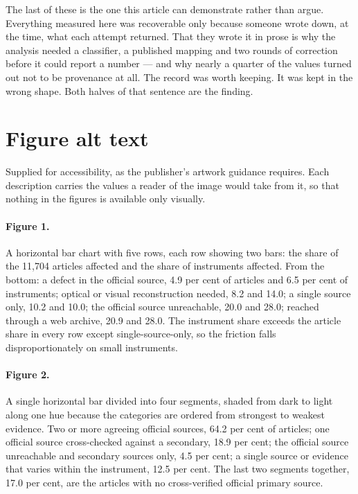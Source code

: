 \documentclass[11pt]{article}
\begin{document}
The last of these is the one this article can demonstrate rather than argue.
Everything measured here was recoverable only because someone wrote down, at
the time, what each attempt returned. That they wrote it in prose is why the
analysis needed a classifier, a published mapping and two rounds of correction
before it could report a number --- and why nearly a quarter of the values
turned out not to be provenance at all. The record was worth keeping. It was
kept in the wrong shape. Both halves of that sentence are the finding.

\section*{Figure alt text}

Supplied for accessibility, as the publisher's artwork guidance requires. Each
description carries the values a reader of the image would take from it, so
that nothing in the figures is available only visually.

\paragraph{Figure 1.} A horizontal bar chart with five rows, each row showing
two bars: the share of the 11,704 articles affected and the share of
instruments affected. From the bottom: a defect in the official source, 4.9 per
cent of articles and 6.5 per cent of instruments; optical or visual
reconstruction needed, 8.2 and 14.0; a single source only, 10.2 and 10.0; the
official source unreachable, 20.0 and 28.0; reached through a web archive, 20.9
and 28.0. The instrument share exceeds the article share in every row except
single-source-only, so the friction falls disproportionately on small
instruments.

\paragraph{Figure 2.} A single horizontal bar divided into four segments,
shaded from dark to light along one hue because the categories are ordered from
strongest to weakest evidence. Two or more agreeing official sources, 64.2 per
cent of articles; one official source cross-checked against a secondary, 18.9
per cent; the official source unreachable and secondary sources only, 4.5 per
cent; a single source or evidence that varies within the instrument, 12.5 per
cent. The last two segments together, 17.0 per cent, are the articles with no
cross-verified official primary source.
\end{document}
